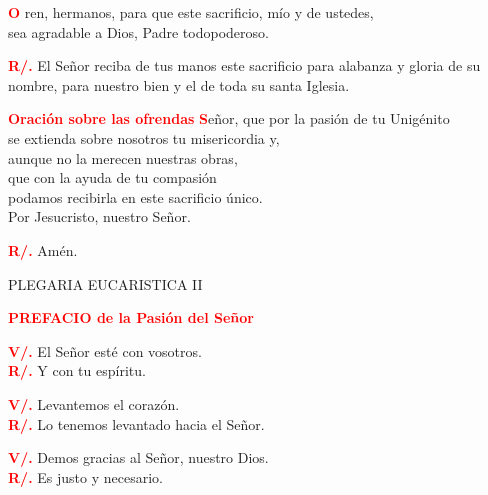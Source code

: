 \documentclass[12pt, letterpaper]{report}
\begin{document}
	\lettrine[lines=2]{\bfseries \textcolor{red}{O}}{} \Large ren, hermanos, para que este sacrificio, m\'io y de ustedes,\\
	sea agradable a Dios, Padre todopoderoso.

	\noindent
	\Large {\bfseries \textcolor{red}{R/.}} \hspace{0.5cm} El Se\~nor reciba de tus manos este sacrificio para alabanza y gloria de su nombre, para nuestro bien y el de toda su santa Iglesia.

	\Large {\bfseries \textcolor{red}{Oraci\'on sobre las ofrendas}}
	\lettrine[lines=2]{\bfseries \textcolor{red}{S}}{}\Large eñor, que por la pasión de tu Unigénito\\
	se extienda sobre nosotros tu misericordia y,\\
	aunque no la merecen nuestras obras,\\
	que con la ayuda de tu compasión\\
	podamos recibirla en este sacrificio único.\\
	Por Jesucristo, nuestro Señor.

	\noindent
	\Large{{\bfseries \textcolor{red}{R/.}} \hspace{0.5cm} Amén.}

	\begin{center}
		\Large PLEGARIA EUCARISTICA II
	\end{center}

	\Large {\bfseries \textcolor{red}{PREFACIO de la Pasión del Señor}}

	\noindent
	\Large {\bfseries \textcolor{red}{V/.}} \hspace{0.5cm} El Se\~nor est\'e con vosotros.\\
	\noindent
	\Large {\bfseries \textcolor{red}{R/.}} \hspace{0.5cm} Y con tu esp\'iritu.

	\noindent
	\Large {\bfseries \textcolor{red}{V/.}} \hspace{0.5cm} Levantemos el coraz\'on.\\
	\noindent
	\Large {\bfseries \textcolor{red}{R/.}} \hspace{0.5cm} Lo tenemos levantado hacia el Se\~nor.

	\noindent
	\Large {\bfseries \textcolor{red}{V/.}} \hspace{0.5cm} Demos gracias al Se\~nor, nuestro Dios.\\
	\noindent
	\Large {\bfseries \textcolor{red}{R/.}} \hspace{0.5cm} Es justo y necesario.
\end{document}
